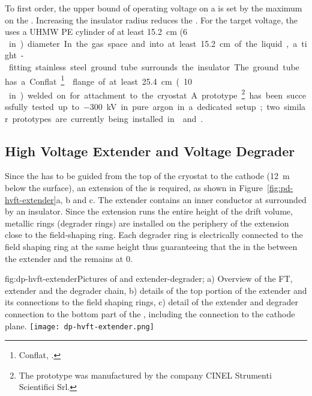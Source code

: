 To first order, the upper bound of operating voltage on a \fdth is set by the maximum \efield on the \fdth.  Increasing the insulator radius reduces the \efield.  For the target voltage, the \fdth uses a UHMW PE cylinder of at least \SI{15.2}{\cm} (\SI{6}\,in) diameter.  In the gas space and into at least \SI{15.2}{\cm} of the liquid, a tight-fitting stainless steel ground tube surrounds the insulator.  The ground tube has a Conflat~\footnote{Conflat\texttrademark{}, \url{}.} 
flange of at least \SI{25.4}{\cm} (\SI{10}\,in) welded on for attachment to the cryostat.  A prototype\footnote{The prototype was manufactured by the company CINEL\texttrademark{} Strumenti Scientifici Srl.}  has been successfully tested up to \SI{-300}{\kV} in pure argon in a dedicated setup; two similar prototypes are currently being installed in  and .


\subsection{High Voltage Extender and Voltage Degrader}

Since the  has to be guided from the top of the cryostat to the cathode (\SI{12}{\m} below the  surface), an extension of the  \fdth is required, as shown in Figure~\ref{fig:pd-hvft-extender}a, b and c. The extender contains an inner conductor at \dptargetdriftvoltneg surrounded by an insulator. Since the extension runs the entire height of the drift volume, metallic rings (degrader rings) are installed on the periphery of the extension close to the field-shaping ring. Each degrader ring is electrically connected to the field shaping ring at the same height thus guaranteeing that the \efield in the \lar between the extender and the  remains at 0.


\begin{dunefigure}{fig:dp-hvft-extender}{Pictures of  \fdth and  extender-degrader; a) Overview of the  FT,  extender and the degrader chain, b) details of the top portion of the  extender and its connections to the field shaping rings, c) detail of the  extender and degrader connection to the bottom part of the , including the connection to the cathode plane.}
\texttt{[image: dp-hvft-extender.png]}
\end{dunefigure}

